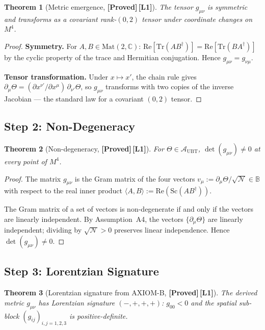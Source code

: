 \documentclass[12pt,a4paper]{article}
\newtheorem{theorem}{Theorem}[section]
\theoremstyle{definition}
\theoremstyle{remark}
\newcommand{\PROVED}{\textbf{[Proved]}}
\newcommand{\Lone}{\textbf{[L1]}}
\newcommand{\BB}{\mathbb{B}}
\newcommand{\CC}{\mathbb{C}}
\newcommand{\Tr}{\mathrm{Tr}}
\newcommand{\re}{\mathrm{Re}}
\newcommand{\calA}{\mathcal{A}}
\newcommand{\calN}{\mathcal{N}}
\begin{document}
\begin{theorem}[Metric emergence, \PROVED\,\Lone]
\label{thm:metric}
The tensor $g_{\mu\nu}$ is symmetric and transforms as a covariant
rank-$(0,2)$ tensor under coordinate changes on $M^4$.
\end{theorem}

\begin{proof}
\textbf{Symmetry.}
For $A,B \in \mathrm{Mat}(2,\CC)$:
$\re[\Tr(AB^\dagger)] = \re[\Tr(BA^\dagger)]$
by the cyclic property of the trace and Hermitian conjugation.
Hence $g_{\mu\nu} = g_{\nu\mu}$.

\textbf{Tensor transformation.}
Under $x \mapsto x'$, the chain rule gives
$\partial_\mu\Theta = (\partial x^{\nu'}/\partial x^\mu)\,\partial_{\nu'}\Theta$,
so $g_{\mu\nu}$ transforms with two copies of the inverse Jacobian ---
the standard law for a covariant $(0,2)$ tensor.
\end{proof}

\subsection{Step 2: Non-Degeneracy}
\label{sec:step2}

\begin{theorem}[Non-degeneracy, \PROVED\,\Lone]
\label{thm:nondeg}
For $\Theta \in \calA_{\mathrm{UBT}}$,
$\det(g_{\mu\nu}) \neq 0$ at every point of $M^4$.
\end{theorem}

\begin{proof}
The matrix $g_{\mu\nu}$ is the Gram matrix of the four vectors
$v_\mu := \partial_\mu\Theta/\sqrt{\calN} \in \BB$
with respect to the real inner product
$\langle A,B\rangle := \re(\mathrm{Sc}(AB^\dagger))$.

The Gram matrix of a set of vectors is non-degenerate if and only if the vectors
are linearly independent.
By Assumption~A4, the vectors $\{\partial_\mu\Theta\}$ are linearly independent;
dividing by $\sqrt{\calN} > 0$ preserves linear independence.
Hence $\det(g_{\mu\nu}) \neq 0$.
\end{proof}

\subsection{Step 3: Lorentzian Signature}
\label{sec:step3}

\begin{theorem}[Lorentzian signature from AXIOM-B, \PROVED\,\Lone]
\label{thm:signature}
The derived metric $g_{\mu\nu}$ has Lorentzian signature $(-,+,+,+)$:
$g_{00} < 0$ and the spatial sub-block $(g_{ij})_{i,j=1,2,3}$ is
positive-definite.
\end{theorem}
\end{document}
